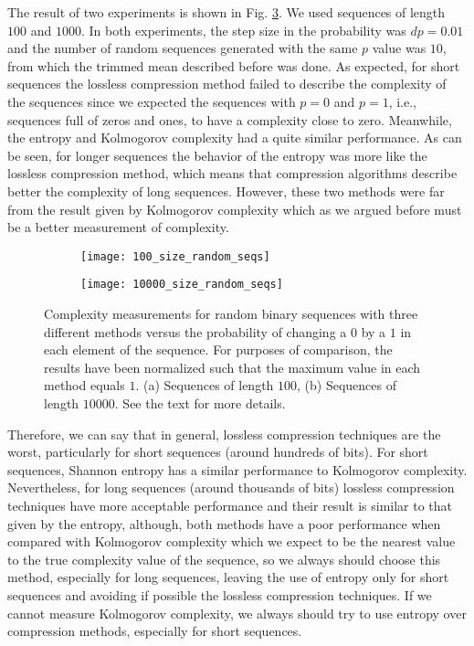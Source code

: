 The result of two experiments is shown in Fig. \ref{fig:random_seqs}. We used sequences of length $100$ and $1000$. In both experiments, the step size in the probability was $dp=0.01$ and the number of random sequences generated with the same $p$ value was $10$, from which the trimmed mean described before was done. As expected, for short sequences the lossless compression method failed to describe the complexity of the sequences since we expected the sequences with $p=0$ and $p=1$, i.e., sequences full of zeros and ones, to have a complexity close to zero. Meanwhile, the entropy and Kolmogorov complexity had a quite similar performance. As can be seen, for longer sequences the behavior of the entropy was more like the lossless compression method, which means that compression algorithms describe better the complexity of long sequences. However, these two methods were far from the result given by Kolmogorov complexity which as we argued before must be a better measurement of complexity.\\

\begin{figure}
	\centering
	\begin{subfigure}[b]{0.49\textwidth}
		\centering
		\texttt{[image: 100\_size\_random\_seqs]}
		\caption{}
		\label{fig:100_size_random_seqs}
	\end{subfigure}
	\hspace{0.5mm}
	\begin{subfigure}[b]{0.49\textwidth}
		\centering
		\texttt{[image: 10000\_size\_random\_seqs]}
		\caption{}
		\label{fig:10000_size_random_seqs}
	\end{subfigure}
	\caption[Complexity measurements for random binary sequences with three different methods.]{Complexity measurements for random binary sequences with three different methods versus the probability of changing a $0$ by a $1$ in each element of the sequence. For purposes of comparison, the results have been normalized such that the maximum value in each method equals $1$. (a) Sequences of length $100$, (b) Sequences of length $10000$. See the text for more details.}
	\label{fig:random_seqs}
\end{figure}

Therefore, we can say that in general, lossless compression techniques are the worst, particularly for short sequences (around hundreds of bits). For short sequences, Shannon entropy has a similar performance to Kolmogorov complexity. Nevertheless, for long sequences (around thousands of bits) lossless compression techniques have more acceptable performance and their result is similar to that given by the entropy, although, both methods have a poor performance when compared with Kolmogorov complexity which we expect to be the nearest value to the true complexity value of the sequence, so we always should choose this method, especially for long sequences, leaving the use of entropy only for short sequences and avoiding if possible the lossless compression techniques. If we cannot measure Kolmogorov complexity, we always should try to use entropy over compression methods, especially for short sequences.\\

